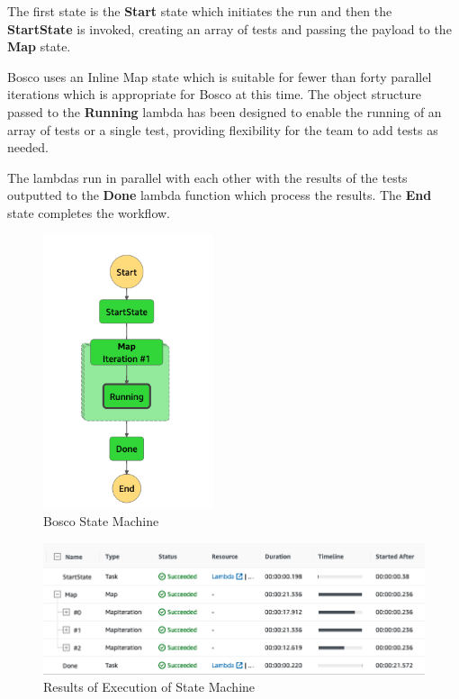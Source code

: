 \documentclass[12pt,a4paper,titlepage]{report}
\begin{document}
The first state is the \textbf{Start} state which initiates the run and then the \textbf{StartState} is invoked, creating an array of tests and passing the payload to the \textbf{Map} state.

Bosco uses an Inline Map state which is suitable for fewer than forty parallel iterations which is appropriate for Bosco at this time. 
The object structure passed to the \textbf{Running} lambda has been designed to enable the running of an array of tests or a single test, providing flexibility for the team to add tests as needed.

The lambdas run in parallel with each other with the results of the tests outputted to the \textbf{Done} lambda function which process the results. The \textbf{End} state completes the workflow.

\begin{figure}[H]
 \centering
 \includegraphics[width=5cm]{./diagrams/step_function}
 \caption{Bosco State Machine}
\end{figure}

\begin{figure}[H]
 \centering
 \includegraphics[width=15cm]{./diagrams/tablestepfx.png}
 \caption{Results of Execution of State Machine}
\end{figure}
\end{document}
